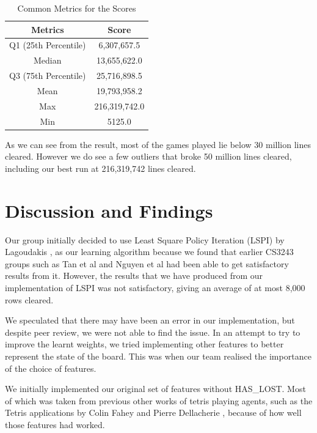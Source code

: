 \documentclass[a4paper,12pt,twocolumn]{article}
\begin{document}
\begin{table}[h]
    \centering
	\begin{tabular}{|c|c|}
		\hline
		\textbf{Metrics}   & \textbf{Score}     \\
		\hline
		Q1 (25th Percentile)  & 6,307,657.5 \\
		\hline
		Median         & 13,655,622.0  \\
		\hline
		Q3 (75th Percentile)      & 25,716,898.5 \\
		\hline
		Mean & 19,793,958.2 \\
		\hline
		Max     & 216,319,742.0  \\
		\hline
		Min          & 5125.0 \\
		\hline
	\end{tabular}
	\caption{Common Metrics for the Scores}
	\label{metric_scores}
\end{table}

As we can see from the result, most of the games played lie below 30 million lines
cleared. However we do see a few outliers that broke 50 million lines cleared, including
our best run at 216,319,742 lines cleared.

\section{Discussion and Findings}
\label{discussion_n_findings}
Our group initially decided to use Least Square Policy Iteration (LSPI) by Lagoudakis \cite{lagoudakis},
as our learning algorithm because we found that earlier CS3243 groups such as
Tan et al \cite{shawntan} and Nguyen et al \cite{nhannguyen} had been able to get
satisfactory results from it. However, the results that we have produced from our
implementation of LSPI was not satisfactory, giving an average of at most 8,000 rows
cleared.

We speculated that there may have been an error in our implementation, but despite
peer review, we were not able to find the issue. In an attempt to try to improve the
learnt weights, we tried implementing other features to better represent the state
of the board. This was when our team realised the importance of the choice of features.

We initially implemented our original set of features without HAS\_LOST. Most of which
was taken from previous other works of tetris playing agents, such as the Tetris
applications by Colin Fahey and Pierre Dellacherie \cite{colin_fahey}, because of
how well those features had worked.
\end{document}
